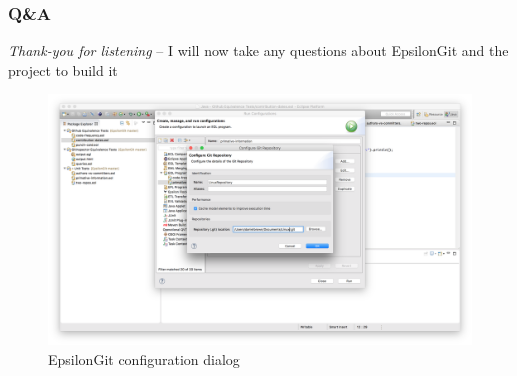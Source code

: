 \documentclass[aspectratio=1610]{beamer}
\begin{document}
\begin{frame}
	\frametitle{Q\&A}
	\textit{Thank-you for listening} -- I will now take any questions about EpsilonGit and the project to build it
	\begin{figure}[h]
	\centering
	\includegraphics[width=\textwidth]{../thesis/images/epsilonintegration}
	\caption{EpsilonGit configuration dialog}
	\label{fig:epsilonintegration}
\end{figure}
\end{frame}
\end{document}
